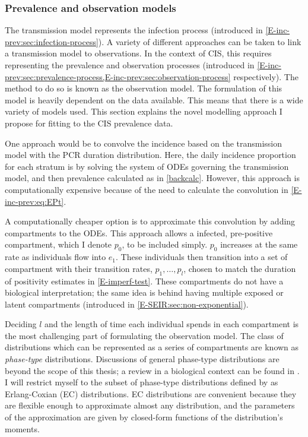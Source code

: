 \documentclass[thesis.tex]{subfiles}
\begin{document}
\subsubsection{Prevalence and observation models} \label{SEIR:sec:observation}


The transmission model represents the infection process (introduced in \cref{E-inc-prev:sec:infection-process}).
A variety of different approaches can be taken to link a transmission model to observations.
In the context of CIS, this requires representing the prevalence and observation processes (introduced in \cref{E-inc-prev:sec:prevalence-process,E-inc-prev:sec:observation-process} respectively).
The method to do so is known as the observation model.
The formulation of this model is heavily dependent on the data available.
This means that there is a wide variety of models used.
This section  explains the novel modelling approach I propose for fitting to the CIS prevalence data.

One approach would be to convolve the incidence based on the transmission model with the PCR duration distribution.
Here, the daily incidence proportion for each stratum is by solving the system of ODEs governing the transmission model, and then prevalence calculated as in \cref{backcalc}.
However, this approach is computationally expensive because of the need to calculate the convolution in \cref{E-inc-prev:eq:EPt}.

A computationally cheaper option is to approximate this convolution by adding compartments to the ODEs.
This approach allows a infected, pre-positive compartment, which I denote $p_0$, to be included simply.
$p_0$ increases at the same rate as individuals flow into $e_1$.
These individuals then transition into a set of compartment with their transition rates, $p_1, \dots, p_l$, chosen to match the duration of positivity estimates in \cref{E-imperf-test}.
These compartments do not have a biological interpretation; the same idea is behind having multiple exposed or latent compartments (introduced in \cref{E-SEIR:sec:non-exponential}).

Deciding $l$ and the length of time each individual spends in each compartment is the most challenging part of formulating the observation model.
The class of distributions which can be represented as a series of compartments are known as \emph{phase-type} distributions.
Discussions of general phase-type distributions are beyond the scope of this thesis; a review in a biological context can be found in \textcite{hobolthPhasetype}.
I will restrict myself to the subset of phase-type distributions defined by \textcite{osogamiClosed} as Erlang-Coxian (EC) distributions.
EC distributions are convenient because they are flexible enough to approximate almost any distribution, and the parameters of the approximation are given by closed-form functions of the distribution's moments.
\end{document}
